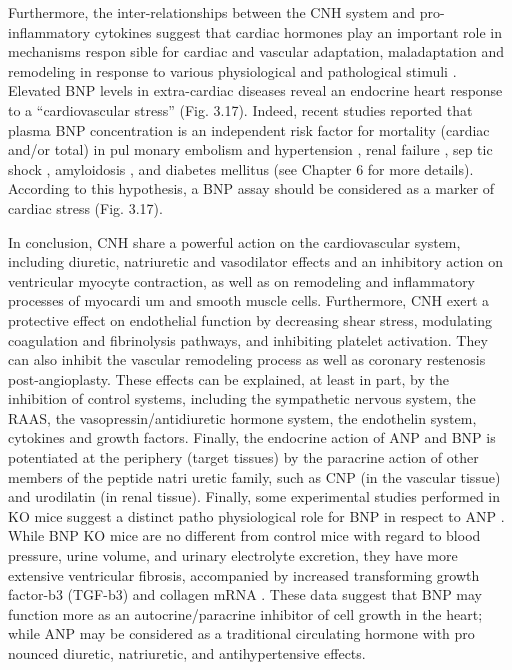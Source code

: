 \documentclass[14pt,a4paper,onecolumn]{extarticle}
\begin{document}
Furthermore, the inter-relationships between the CNH system and pro-inflammatory cytokines suggest that cardiac hormones play an important role in mechanisms respon sible for cardiac and vascular adaptation, maladaptation and remodeling in response to various physiological and pathological stimuli \citep{32}\citep{35}\citep{62}\citep{162}.  Elevated BNP levels in extra-cardiac diseases reveal an endocrine heart response to a “cardiovascular stress” (Fig. 3.17). Indeed, recent studies reported that plasma BNP concentration is an independent risk factor for mortality (cardiac and/or total) in pul monary embolism \citep{121}\citep{123}\citep{124} and hypertension \citep{127}, renal failure \citep{28}\citep{100}\citep{144}, sep tic shock \citep{145}, amyloidosis \citep{149}, and diabetes mellitus \citep{141} (see Chapter 6 for more details). According to this hypothesis, a BNP assay should be considered as a marker of cardiac stress (Fig. 3.17).

In conclusion, CNH share a powerful action on the cardiovascular system, including diuretic, natriuretic and vasodilator effects and an inhibitory action on ventricular myocyte contraction, as well as on remodeling and inflammatory processes of myocardi um and smooth muscle cells. Furthermore, CNH exert a protective effect on endothelial function by decreasing shear stress, modulating coagulation and fibrinolysis pathways, and inhibiting platelet activation. They can also inhibit the vascular remodeling process as well as coronary restenosis post-angioplasty. These effects can be explained, at least in part, by the inhibition of control systems, including the sympathetic nervous system, the RAAS, the vasopressin/antidiuretic hormone system, the endothelin system, cytokines and growth factors. Finally, the endocrine action of ANP and BNP is potentiated at the periphery (target tissues) by the paracrine action of other members of the peptide natri uretic family, such as CNP (in the vascular tissue) and urodilatin (in renal tissue).  Finally, some experimental studies performed in KO mice suggest a distinct patho physiological role for BNP in respect to ANP \citep{18}. While BNP KO mice are no different from control mice with regard to blood pressure, urine volume, and urinary electrolyte excretion, they have more extensive ventricular fibrosis, accompanied by increased transforming growth factor-b3 (TGF-b3) and collagen mRNA \citep{18}. These data suggest that BNP may function more as an autocrine/paracrine inhibitor of cell growth in the heart; while ANP may be considered as a traditional circulating hormone with pro nounced diuretic, natriuretic, and antihypertensive effects.
\end{document}
